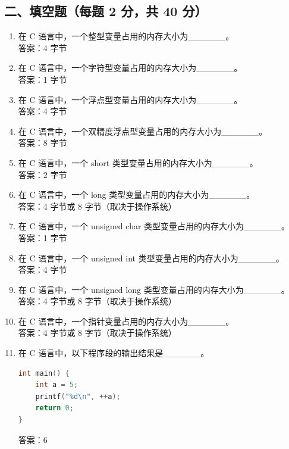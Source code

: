 \documentclass[a4paper,12pt]{article}
\begin{document}
\subsection{二、填空题（每题 2 分，共 40 分）}

\begin{enumerate}
    \item 在 C 语言中，一个整型变量占用的内存大小为\_\_\_\_\_\_。\\
    答案：4 字节

    \item 在 C 语言中，一个字符型变量占用的内存大小为\_\_\_\_\_\_。\\
    答案：1 字节

    \item 在 C 语言中，一个浮点型变量占用的内存大小为\_\_\_\_\_\_。\\
    答案：4 字节

    \item 在 C 语言中，一个双精度浮点型变量占用的内存大小为\_\_\_\_\_\_。\\
    答案：8 字节

    \item 在 C 语言中，一个 short 类型变量占用的内存大小为\_\_\_\_\_\_。\\
    答案：2 字节

    \item 在 C 语言中，一个 long 类型变量占用的内存大小为\_\_\_\_\_\_。\\
    答案：4 字节或 8 字节（取决于操作系统）

    \item 在 C 语言中，一个 unsigned char 类型变量占用的内存大小为\_\_\_\_\_\_。\\
    答案：1 字节

    \item 在 C 语言中，一个 unsigned int 类型变量占用的内存大小为\_\_\_\_\_\_。\\
    答案：4 字节

    \item 在 C 语言中，一个 unsigned long 类型变量占用的内存大小为\_\_\_\_\_\_。\\
    答案：4 字节或 8 字节（取决于操作系统）

    \item 在 C 语言中，一个指针变量占用的内存大小为\_\_\_\_\_\_。\\
    答案：4 字节或 8 字节（取决于操作系统）

    \item 在 C 语言中，以下程序段的输出结果是\_\_\_\_\_\_。
    \begin{lstlisting}[language=C]
int main() {
    int a = 5;
    printf("%d\n", ++a);
    return 0;
}
    \end{lstlisting}
    答案：6


\end{enumerate}
\end{document}
